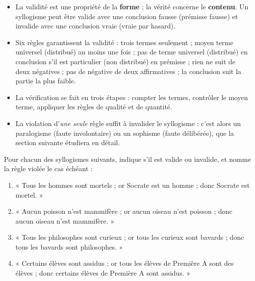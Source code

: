 \documentclass[11pt]{article}
\newcommand{\cle}[1]{{\popxbold\color{popdark}#1}}
\begin{document}
\begin{aretenir}
\begin{itemize}
\item La \cle{validité} est une propriété de la \textbf{forme} ; la \cle{vérité} concerne le \textbf{contenu}. Un syllogisme peut être valide avec une conclusion fausse (prémisse fausse) et invalide avec une conclusion vraie (vraie par hasard).
\item Six règles garantissent la validité : trois termes seulement ; moyen terme universel (distribué) au moins une fois ; pas de terme universel (distribué) en conclusion s'il est particulier (non distribué) en prémisse ; rien ne suit de deux négatives ; pas de négative de deux affirmatives ; la conclusion suit la partie la plus faible.
\item La vérification se fait en trois étapes : compter les termes, contrôler le moyen terme, appliquer les règles de qualité et de quantité.
\item La violation d'\emph{une seule} règle suffit à invalider le syllogisme : c'est alors un \cle{paralogisme} (faute involontaire) ou un \cle{sophisme} (faute délibérée), que la section suivante étudiera en détail.
\end{itemize}
\end{aretenir}

\begin{exercice}
Pour chacun des syllogismes suivants, indique s'il est valide ou invalide, et nomme la règle violée le cas échéant :
\begin{enumerate}
\item « Tous les hommes sont mortels ; or Socrate est un homme ; donc Socrate est mortel. »
\item « Aucun poisson n'est mammifère ; or aucun oiseau n'est poisson ; donc aucun oiseau n'est mammifère. »
\item « Tous les philosophes sont curieux ; or tous les curieux sont bavards ; donc tous les bavards sont philosophes. »
\item « Certains élèves sont assidus ; or tous les élèves de Première A sont des élèves ; donc certains élèves de Première A sont assidus. »
\end{enumerate}
\end{exercice}
\end{document}
